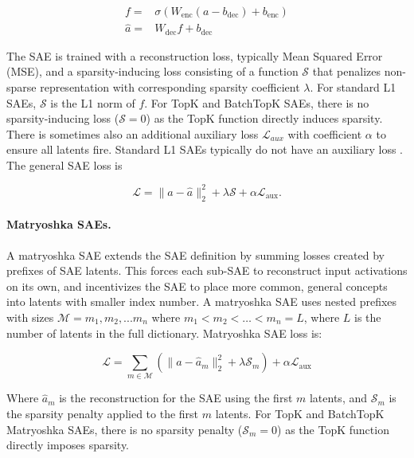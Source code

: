 \documentclass{article}
\theoremstyle{plain}
\theoremstyle{definition}
\theoremstyle{remark}
\newcommand{\enc}{\text{enc}}
\newcommand{\dec}{\text{dec}}
\newcommand{\aux}{\text{aux}}
\begin{document}
\begin{align}
f = & \sigma(W_\enc (a - b_\dec) + b_\enc) \\
\hat{a} = & W_\dec f + b_\dec
\end{align}

The SAE is trained with a reconstruction loss, typically Mean Squared Error (MSE), and a sparsity-inducing loss consisting of a function \(\mathcal{S}\) that penalizes non-sparse representation with corresponding sparsity coefficient \(\lambda\). For standard L1 SAEs, \(\mathcal{S}\) is the L1 norm of \(f\). For TopK and BatchTopK SAEs, there is no sparsity-inducing loss (\(\mathcal{S}=0\)) as the TopK function directly induces sparsity. There is sometimes also an additional auxiliary loss \(\mathcal{L}_{aux}\) with coefficient \(\alpha\) to ensure all latents fire. Standard L1 SAEs typically do not have an auxiliary loss \citep{olah2024april}. The general SAE loss is

\begin{equation}
        \mathcal{L} = \|a - \hat{a}\|_2^2 + \lambda \mathcal{S} + \alpha \mathcal{L}_\aux.
\end{equation}


\paragraph{Matryoshka SAEs.} A matryoshka SAE \citep{bussmann2025learning} extends the SAE definition by summing losses created by prefixes of SAE latents. This forces each sub-SAE to reconstruct input activations on its own, and incentivizes the SAE to place more common, general concepts into latents with smaller index number. A matryoshka SAE uses nested prefixes with sizes \(\mathcal{M} = m_1, m_2, ... m_n\) where \(m_1 < m_2 < \ldots < m_n = L\), where \(L\) is the number of latents in the full dictionary. Matryoshka SAE loss is:

\begin{equation}
    \mathcal{L} = \sum_{m \in \mathcal{M}} \left( \|a - \hat{a}_{m}\|_2^2 + \lambda \mathcal{S}_{m} \right) + \alpha \mathcal{L}_\aux
    \label{eq:matryoshka}
\end{equation}

Where \(\hat{a}_m\) is the reconstruction for the SAE using the first \(m\) latents, and \(\mathcal{S}_m\) is the sparsity penalty applied to the first \(m\) latents. For TopK and BatchTopK Matryoshka SAEs, there is no sparsity penalty (\(\mathcal{S}_m=0\)) as the TopK function directly imposes sparsity.
\end{document}
